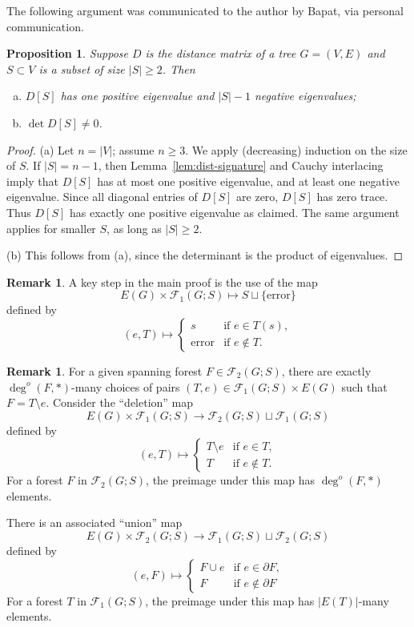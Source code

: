 \documentclass{amsart}
\newtheorem{prop}[thm]{Proposition}
\theoremstyle{definition}
\newtheorem{rmk}[thm]{Remark}
\newcommand{\trees}{\mathcal{F}_1}
\newcommand{\forests}{\mathcal{F}}
\newcommand{\degout}{\deg^o}
\begin{document}
The following argument was communicated to the author by Bapat, via personal communication.
\begin{prop}
\label{prop:distance-sub-nonsingular}
Suppose $D$ is the distance matrix of a tree $G = (V,E)$ and $S \subset V$ is a subset of size $|S| \geq 2$. 
Then
\begin{enumerate}[(a)]
\item $D[S]$ has one positive eigenvalue and $|S| - 1$ negative eigenvalues;

\item $\det D[S] \neq 0$.

\end{enumerate}
\end{prop}
\begin{proof}
(a) Let $n = |V|$; assume $n \geq 3$.
We apply (decreasing) induction on the size of $S$. 
If $|S| = n - 1$, then Lemma~\ref{lem:dist-signature} and Cauchy interlacing imply that $D[S]$ has at most one positive eigenvalue, and at least one negative eigenvalue. 
Since all diagonal entries of $D[S]$ are zero, $D[S]$ has zero trace. 
Thus $D[S]$ has exactly one positive eigenvalue as claimed.
The same argument applies for smaller $S$, as long as $|S| \geq 2$.

(b) This follows from (a), since the determinant is the product of eigenvalues.
\end{proof}


\begin{rmk}
A key step in the main proof is the use of the map
\[
	E(G) \times \trees(G;S) \mapsto S \sqcup \{\text{error}\}
\]
defined by
\[
	(e, T) \mapsto \begin{cases}
		s &\text{if } e \in T(s), \\
		\text{error} &\text{if } e \not\in T .
	\end{cases}
\]
\end{rmk}

\begin{rmk}
For a given spanning forest
$F \in \forests_2(G;S)$,
there are exactly $\degout(F, *)$-many choices of pairs $(T,e) \in \trees(G;S) \times E(G)$ such that
$F = T \setminus e.$
Consider the ``deletion'' map
\[
	E(G) \times \trees(G;S) \to \forests_2(G;S) \sqcup \trees(G;S)
\]
defined by
\[
	(e, T) \mapsto \begin{cases}
	T \setminus e &\text{if } e\in T,\\
	T &\text{if } e\not\in T.
	\end{cases}
\]
For a forest $F$ in $\forests_2(G;S)$,
the preimage under this map has $\degout(F,*)$ elements.

There is an associated ``union'' map 
\[
	E(G) \times \forests_2(G;S) \longrightarrow \trees(G;S) \sqcup \forests_2(G;S)
\]
defined by
\[
	(e, F) \mapsto \begin{cases}
		F \cup e &\text{if } e \in \partial F, \\
		F &\text{if } e \not\in \partial F
	\end{cases}
\]
For a forest $T$ in $\trees(G; S)$, the preimage under this map has $|E(T)|$-many elements.
\end{rmk}
\end{document}
